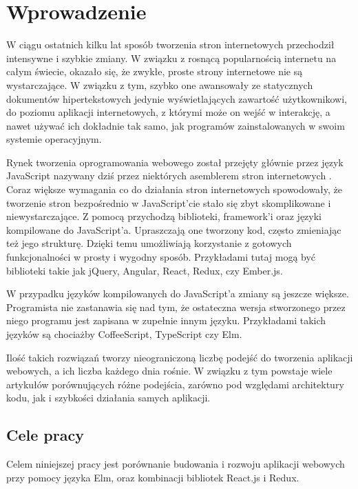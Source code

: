 \chapter{Wprowadzenie}
\label{cha:wstep}
W ciągu ostatnich kilku lat sposób tworzenia stron internetowych przechodził intensywne i szybkie zmiany. W związku z rosnącą popularnością internetu na całym świecie, okazało się, że zwykłe, proste strony internetowe nie są wystarczające. W związku z tym, szybko one awansowały ze statycznych dokumentów hipertekstowych jedynie wyświetlających zawartość użytkownikowi, do poziomu aplikacji internetowych, z którymi może on wejść w interakcję, a nawet używać ich dokładnie tak samo, jak programów zainstalowanych w swoim systemie operacyjnym. 

Rynek tworzenia oprogramowania webowego został przejęty głównie przez język JavaScript nazywany dziś przez niektórych asemblerem stron internetowych \cite{JSAssembly}. Coraz większe wymagania co do działania stron internetowych spowodowały, że tworzenie stron bezpośrednio w JavaScript'cie stało się zbyt skomplikowane i niewystarczające. Z pomocą przychodzą biblioteki, framework'i oraz języki kompilowane do JavaScript'a. Upraszczają one tworzony kod, często zmieniając też jego strukturę. Dzięki temu umożliwiają korzystanie z gotowych funkcjonalności w prosty i wygodny sposób. Przykładami tutaj mogą być biblioteki takie jak jQuery, Angular, React, Redux, czy Ember.js. 

W przypadku języków kompilowanych do JavaScript'a zmiany są jeszcze większe. Programista nie zastanawia się nad tym, że ostateczna wersja stworzonego przez niego programu jest zapisana w zupełnie innym języku. Przykładami takich języków są chociażby CoffeeScript, TypeScript czy Elm.

Ilość takich rozwiązań tworzy nieograniczoną liczbę podejść do tworzenia aplikacji webowych, a ich liczba każdego dnia rośnie. W związku z tym powstaje wiele artykułów porównujących różne podejścia, zarówno pod względami architektury kodu, jak i szybkości działania samych aplikacji.

\section{Cele pracy}
Celem niniejszej pracy jest porównanie budowania i rozwoju aplikacji webowych przy pomocy języka Elm, oraz kombinacji bibliotek React.js i Redux.
